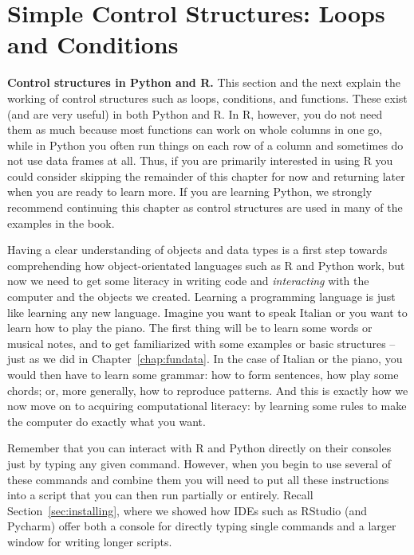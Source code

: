 
\section{Simple Control Structures: Loops and Conditions}	
\label{sec:controlstructures}

\begin{feature}\textbf{Control structures in Python and R.}
  This section and the next explain the working of control structures
  such as loops, conditions, and functions.
  These exist (and are very useful) in both Python and R.
  In R, however, you do not need them as much because most functions
  can work on whole columns in one go, while in Python you often run things
  on each row of a column and sometimes do not use data frames at all.
  Thus, if you are primarily interested in using R you could consider skipping
  the remainder of this chapter for now and returning later when you are ready to learn more.
  If you are learning Python, we strongly recommend continuing this chapter as
  control structures are used in many of the examples in the book.
  \end{feature}
  


Having a clear understanding of objects and data types is a first step
towards comprehending how object-orientated languages such as R and Python work,
but now we need to get some literacy in writing code and \emph{interacting}
with the computer and the objects we created. Learning a programming
language is just like learning any new language.  Imagine you want to
speak Italian or you want to learn how to play the piano. The first thing
will be to learn some words or musical notes, and to get familiarized
with some examples or basic structures -- just as we did in Chapter~\ref{chap:fundata}. In the
case of Italian or the piano, you would then have to learn  some grammar:
how to form sentences, how play some chords; or, more generally,
how to reproduce patterns. And this is exactly how we 
now move on to acquiring computational literacy: by learning some
rules to make the computer do exactly what you want.

Remember that you can interact with R and Python directly on their
consoles just by typing any given command. However, when
you begin to use several of these commands and combine them
you will need to put all these instructions into a
script that you can then run partially or entirely. Recall Section~\ref{sec:installing},
where we showed how IDEs such as RStudio (and Pycharm) offer both a
console for directly typing single commands and a larger window
for writing longer scripts.

